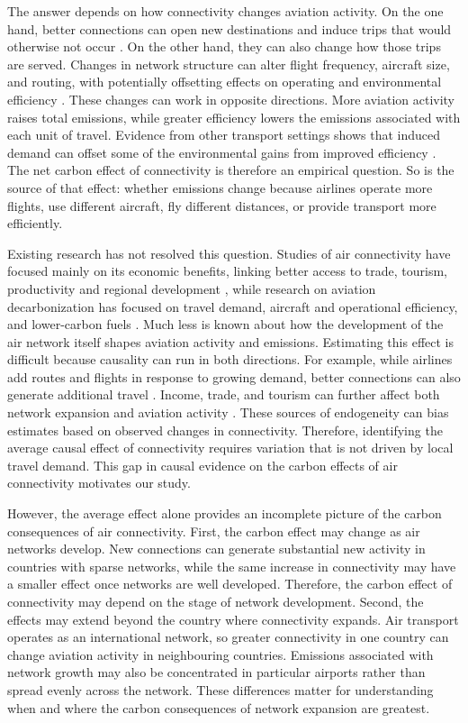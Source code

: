 \documentclass[12pt]{extarticle}
\begin{document}
The answer depends on how connectivity changes aviation activity. On the
one hand, better connections can open new destinations and induce trips
that would otherwise not occur \citep{koo2017,piermartini2013}. On the
other hand, they can also change how those trips are served. Changes in
network structure can alter flight frequency, aircraft size, and routing,
with potentially offsetting effects on operating and environmental
efficiency \citep{brueckner2004,pels2021}. These changes can work in
opposite directions. More aviation activity raises total emissions, while
greater efficiency lowers the emissions associated with each unit of
travel. Evidence from other transport settings shows that induced demand
can offset some of the environmental gains from improved efficiency
\citep{hymel2010,ou2024}. The net carbon effect of connectivity is
therefore an empirical question. So is the source of that effect: whether
emissions change because airlines operate more flights, use different
aircraft, fly different distances, or provide transport more efficiently.

Existing research has not resolved this question. Studies of air
connectivity have focused mainly on its economic benefits, linking better
access to trade, tourism, productivity and regional development
\citep{lenaerts2021,zhang2020}, while research on aviation
decarbonization has focused on travel demand, aircraft and operational
efficiency, and lower-carbon fuels \citep{bergero2023,dray2022}. Much
less is known about how the development of the air network itself shapes
aviation activity and emissions. Estimating this effect is difficult
because causality can run in both directions. For example, while airlines
add routes and flights in response to growing demand, better connections
can also generate additional travel \citep{koo2017,pitfield2010}. Income,
trade, and tourism can further affect both network expansion and aviation
activity \citep{vandevijver2014,lenzen2018}. These sources of endogeneity can bias
estimates based on observed changes in connectivity. Therefore,
identifying the average causal effect of connectivity requires variation
that is not driven by local travel demand. This gap in causal evidence on
the carbon effects of air connectivity motivates our study.

However, the average effect alone provides an incomplete picture of the
carbon consequences of air connectivity. First, the carbon effect may
change as air networks develop. New connections can generate substantial
new activity in countries with sparse networks, while the same increase in
connectivity may have a smaller effect once networks are well developed.
Therefore, the carbon effect of connectivity may depend on the stage of
network development. Second, the effects may extend beyond the country
where connectivity expands. Air transport operates as an international
network, so greater connectivity in one country can change aviation
activity in neighbouring countries. Emissions associated with network
growth may also be concentrated in particular airports rather than spread
evenly across the network. These differences matter for understanding
when and where the carbon consequences of network expansion are greatest.
\end{document}
